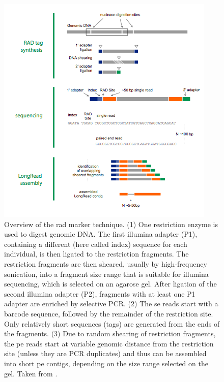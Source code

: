 \documentclass[a4paper,12pt,times,print,index, custombib]{PhDThesisPSnPDF}\usepackage[]{graphicx}\usepackage[]{color}
\begin{document}
\begin{figure}
\centering
\includegraphics[width=.7\textwidth]{RADprotocolOverview}
\caption{Overview of the \gls{rad} marker technique. (1) One restriction enzyme is used to digest genomic DNA. The first illumina adapter (P1), containing a different  (here called index) sequence for each individual, is then ligated to the restriction fragments. The restriction fragments are then sheared, usually by high-frequency sonication, into a fragment size range that is suitable for illumina sequencing, which is selected on an agarose gel. After ligation of the second illumina adapter (P2), fragments with at least one P1 adapter are enriched by selective PCR. (2) The \gls{se} reads start with a barcode sequence, followed by the remainder of the restriction site. Only relatively short sequences (tags) are generated from the ends of the fragments. (3) Due to random shearing of restriction fragments, the \gls{pe} reads start at variable genomic distance from the restriction site (unless they are PCR duplicates) and thus can be assembled into short \gls{pe} contigs, depending on the size range selected on the gel. Taken from \cite{Atwood2011}. }
\label{RAD_protocol_overview}
\end{figure}
\end{document}
